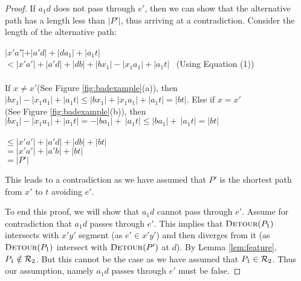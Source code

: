 \begin{proof}
  If $a_1d$ does not pass through $e'$, then we can show that
  the alternative path has a length less than $|P'|$, thus arriving
  at a contradiction.
  Consider the length of the alternative path:
  \begin{tabbing}
   $|x'a'| $\=$+ |a'd| + |da_1| + |a_1t|$\\
   \>$< |x'a'|+ |a'd| + |db|  + |bx_1| - |x_1a_1| + |a_1t|$
  \hspace{10mm}\ (Using  Equation (1))\\\\
  If $x \neq x'$(See Figure  \ref{fig:badexample}(a)), then
  $ |bx_1|  - |x_1a_1|
  + |a_1t| \le  |bx_1|  + |x_1a_1| + |a_1t| = |bt|$. Else if $x
  =x'$ \\
  (See Figure  \ref{fig:badexample}(b)), then $ |bx_1|  - |x_1a_1|
  + |a_1t| = -|ba_1| +\ |a_1t| \le|ba_1| +\ |a_1t| =  |bt|$ \\\\
   \>$\le |x'a'|+ |a'd| + |db| + |bt|$\\
  \>$= |x'a'|+ |a'b| + |bt|$\\
   \>$= |P'|$
  \end{tabbing}

  This leads to a contradiction as we have assumed that $P'$
  is
  the shortest path from $x'$ to $t$ avoiding $e'$.

  To end this proof, we will show that $a_1d$ cannot pass
  through $e'$.
  Assume for contradiction that $a_1d$ passes through $e'$.
  This
  implies that $\textsc{Detour}(P_1)$ intersects with $x'y'$ segment (as
  $e' \in x'y'$) and
  then diverges from it (as $\textsc{Detour}(P_1)$ intersect with $\textsc{Detour}(P')$
  at $d$).
  By Lemma \ref{lem:feature}, $P_1 \notin \mathcal{R}_2$. But this cannot
  be the
  case as we have assumed that $P_1 \in  \mathcal{R}_2$. Thus our assumption,
  namely $a_1d$ passes through $e'$ must be false.






  \end{proof}
\fi




